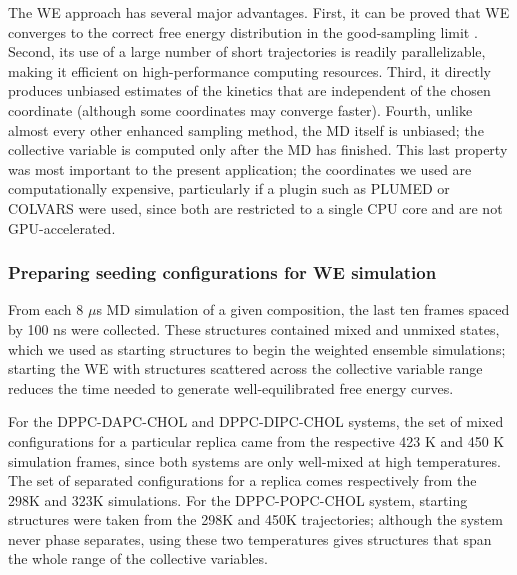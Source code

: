 \documentclass{biophys-new}
\begin{document}
The WE approach has several major advantages. First, it can be proved that WE converges to the correct free energy distribution in the good-sampling limit \cite{Zuckerman2017}. Second, its use of a large number of short trajectories is readily parallelizable, making it efficient on high-performance computing resources. Third, it directly produces unbiased estimates of the kinetics that are independent of the chosen coordinate (although some coordinates may converge faster). Fourth, unlike almost every other enhanced sampling method, the MD itself is unbiased; the collective variable is computed only after the MD has finished. This last property was most important to the present application; the coordinates we used are computationally expensive, particularly if a plugin such as PLUMED\cite{Tribello2019} or COLVARS\cite{Fiorin2013} were used, since both are restricted to a single CPU core and are not GPU-accelerated.

\subsubsection*{Preparing seeding configurations for WE simulation}
From each 8 $\mu$s MD simulation of a given composition, the last ten frames spaced by 100 ns were collected.
These structures contained mixed and unmixed states, which we used as starting structures to begin the weighted ensemble simulations; starting the WE with structures scattered across the collective variable range reduces the time needed to generate well-equilibrated free energy curves.

For the DPPC-DAPC-CHOL and DPPC-DIPC-CHOL systems, the set of mixed configurations for a particular replica came from the respective 423 K and 450 K simulation frames, since both systems are only well-mixed at high temperatures.
The set of separated configurations for a replica comes respectively from the 298K and 323K simulations.
For the DPPC-POPC-CHOL system, starting structures were taken from the 298K and 450K trajectories; although the system never phase separates, using these two temperatures gives structures that span the whole range of the collective variables.
\end{document}
